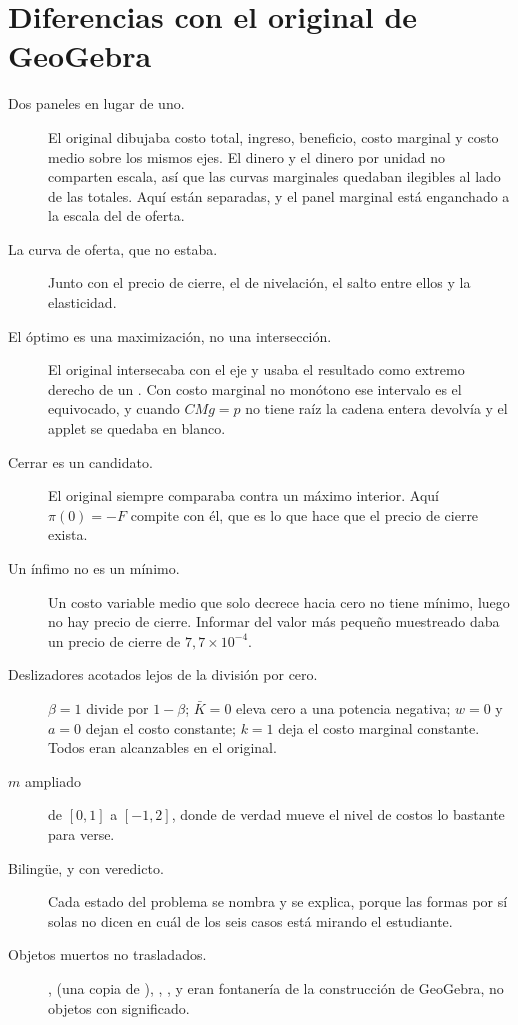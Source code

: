 \documentclass[11pt,a4paper]{appletmanual}
\begin{document}
\section{Diferencias con el original de GeoGebra}

\begin{description}
\item[Dos paneles en lugar de uno.] El original dibujaba costo total, ingreso,
  beneficio, costo marginal y costo medio sobre los mismos ejes. El dinero y el
  dinero por unidad no comparten escala, así que las curvas marginales quedaban
  ilegibles al lado de las totales. Aquí están separadas, y el panel marginal
  está enganchado a la escala del de oferta.
\item[La curva de oferta, que no estaba.] Junto con el precio de cierre, el de
  nivelación, el salto entre ellos y la elasticidad.
\item[El óptimo es una maximización, no una intersección.] El original
  intersecaba  con el eje y usaba el resultado como extremo
  derecho de un . Con costo marginal no monótono
  ese intervalo es el equivocado, y cuando $CMg = p$ no tiene raíz la cadena
  entera devolvía  y el applet se quedaba en blanco.
\item[Cerrar es un candidato.] El original siempre comparaba contra un máximo
  interior. Aquí $\pi(0) = -F$ compite con él, que es lo que hace que el precio
  de cierre exista.
\item[Un ínfimo no es un mínimo.] Un costo variable medio que solo decrece
  hacia cero no tiene mínimo, luego no hay precio de cierre. Informar del valor
  más pequeño muestreado daba un precio de cierre de $7{,}7\times10^{-4}$.
\item[Deslizadores acotados lejos de la división por cero.] $\beta = 1$ divide
  por $1-\beta$; $\bar K = 0$ eleva cero a una potencia negativa; $w = 0$ y
  $a = 0$ dejan el costo constante; $k = 1$ deja el costo marginal constante.
  Todos eran alcanzables en el original.
\item[$m$ ampliado] de $[0, 1]$ a $[-1, 2]$, donde de verdad mueve el nivel de
  costos lo bastante para verse.
\item[Bilingüe, y con veredicto.] Cada estado del problema se nombra y se
  explica, porque las formas por sí solas no dicen en cuál de los seis casos
  está mirando el estudiante.
\item[Objetos muertos no trasladados.] ,  (una copia
  de ), , ,  y  eran
  fontanería de la construcción de GeoGebra, no objetos con significado.
\end{description}
\end{document}
